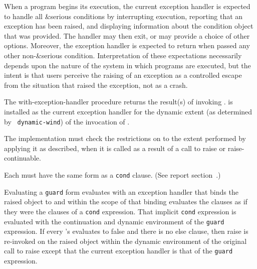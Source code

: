 When a program begins its execution, the current
exception handler is expected to handle all {\cf\&serious}
conditions by interrupting execution, reporting that an
exception has been raised, and displaying information
about the condition object that was provided.  The handler
may then exit, or may provide a choice of other options.
Moreover, the exception handler is expected to return when
passed any other non-{\cf\&serious} condition.
Interpretation of these expectations necessarily depends
upon the nature of the system in which programs are executed,
but the intent is that users perceive the raising of an
exception as a controlled escape from the situation that
raised the exception, not as a crash.

\begin{entry}{%
}

  The {\cf
with-exception-handler} procedure returns the result(s) of invoking
.   is installed as the current
exception handler for the dynamic extent (as determined by {\tt
  dynamic-wind}) of the invocation of .

\implresp The implementation must check the restrictions on
 to the extent performed by applying it as described,
when it is called as a result of a call to {\cf raise} or {\cf
  raise-continuable}.
\end{entry}

\begin{entry}{%
}

\syntax
Each  must have the same form as a {\tt cond} clause.
(See report section~.)

\semantics 
Evaluating a {\tt guard} form evaluates  with an exception
handler that binds the raised object to  and within the scope of
that binding evaluates the clauses as if they were the clauses of a
{\tt cond} expression. That implicit {\tt cond} expression is evaluated with the
continuation and dynamic environment of the {\tt guard} expression. If every
's  evaluates to false and there is no else clause, then
{\cf raise} is re-invoked on the raised object within the dynamic
environment of the original call to raise except that the current
exception handler is that of the {\tt guard} expression.  
\end{entry}

